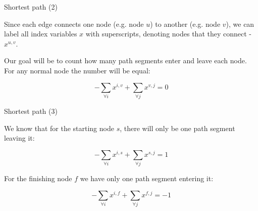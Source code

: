 \documentclass{beamer}
\begin{document}
\begin{frame}{Shortest path (2)}
	\begin{flushleft}
		
		Since each edge connects one node (e.g. node $u$) to another (e.g. node $v$), we can label all index variables $x$ with superscripts, denoting nodes that they connect - $x^{u,v}$.
		
		\bigskip
		
		Our goal will be to count how many path segments enter and leave each node. For any normal node the number will be equal:
		
		\begin{equation}
			-\sum_{\forall i} x^{i,v} + \sum_{\forall j} x^{v,j} = 0
		\end{equation}
		
	
	\end{flushleft}
\end{frame}




\begin{frame}{Shortest path (3)}
	\begin{flushleft}
		
		
		We know that for the starting node $s$, there will only be one path segment leaving it:
		
		\begin{equation}
			-\sum_{\forall i} x^{i,s} + \sum_{\forall j} x^{s,j} = 1
		\end{equation}
		
		For the finishing node  $f$ we have only one path segment entering it:
		
		\begin{equation}
			-\sum_{\forall i} x^{i,f} + \sum_{\forall j} x^{f,j} = -1
		\end{equation}
		
	\end{flushleft}
\end{frame}
\end{document}
